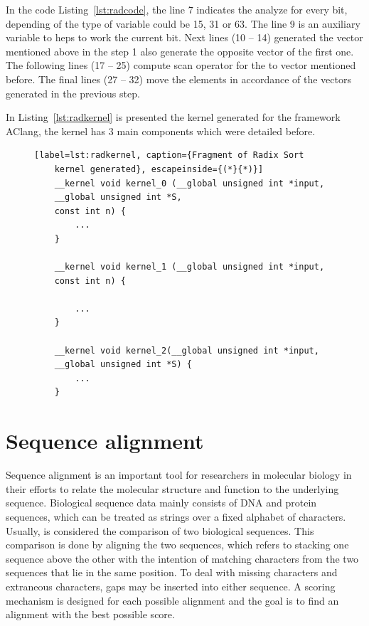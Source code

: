 \documentclass[Ingles]{ic-tese-v1}
\newcommand{\rlst}[1]{Listing~\ref{lst:#1}}
\begin{document}
In the code \rlst{radcode}, the line 7 indicates the analyze for every bit, depending of the
type of variable could be 15, 31 or 63. The line 9 is an auxiliary variable to heps
to work the current bit. Next lines (10 -- 14) generated the vector mentioned above
in the step 1 also generate the opposite vector of the first one. The following lines
(17 -- 25) compute scan operator for the to vector mentioned before. The final lines
(27 -- 32) move the elements in accordance of the vectors generated in the previous step.

In \rlst{radkernel} is presented the kernel generated for the framework AClang,
the kernel has 3 main components which were detailed before.

\begin{figure}[t]
	\lstset{basicstyle=\scriptsize}
	\begin{lstlisting}[label=lst:radkernel, caption={Fragment of Radix Sort
	kernel generated}, escapeinside={(*}{*)}]
	__kernel void kernel_0 (__global unsigned int *input,
	__global unsigned int *S,
	const int n) {
		...
	}

	__kernel void kernel_1 (__global unsigned int *input,
	const int n) {

		...
	}

	__kernel void kernel_2(__global unsigned int *input,
	__global unsigned int *S) {
		...
	}
	\end{lstlisting}
\end{figure}

\section{Sequence alignment}

Sequence alignment is an important tool for
researchers in molecular biology in their efforts to relate
the molecular structure and function to the underlying
sequence. Biological sequence data mainly consists of
DNA and protein sequences, which can be treated as
strings over a fixed alphabet of characters. Usually,
is considered the comparison of two biological sequences.
This comparison is done by aligning the two sequences,
which refers to stacking one sequence above the other
with the intention of matching characters from the two
sequences that lie in the same position. To deal with
missing characters and extraneous characters, gaps may
be inserted into either sequence. A scoring mechanism is
designed for each possible alignment and the goal is to
find an alignment with the best possible score.
\end{document}
